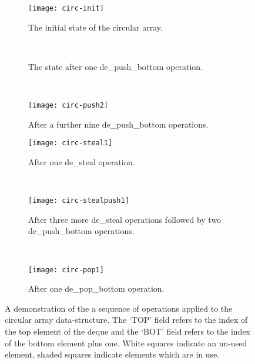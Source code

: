 \begin{figure}[t]
\centering

\begin{subfigure}[t]{0.31\textwidth}
\centering
  \texttt{[image: circ-init]}
  \caption{
     \tiny The initial state of the circular array.
  }
  \label{fig:circ-1}
\end{subfigure}
~ %
\begin{subfigure}[t]{0.31\textwidth}
  \centering
  \caption{
     \tiny The state after one de\_push\_bottom operation.
  }
  \label{fig:circ-2}
\end{subfigure}
~ %
\begin{subfigure}[t]{0.31\textwidth}
  \centering
  \texttt{[image: circ-push2]}
  \caption{
    \tiny After a further nine de\_push\_bottom operations. 
  }
  \label{fig:circ-3}
\end{subfigure}

\vspace{10pt}

\begin{subfigure}[t]{0.31\textwidth}
  \centering
  \texttt{[image: circ-steal1]}
  \caption{
    \tiny After one de\_steal operation.
  }
  \label{fig:circ-4}
\end{subfigure}
~ %
\begin{subfigure}[t]{0.31\textwidth}
  \centering
  \texttt{[image: circ-stealpush1]}
  \caption{
    \tiny After three more de\_steal operations followed by two de\_push\_bottom
          operations.
  }
  \label{fig:circ-5}
\end{subfigure}
~ %
\begin{subfigure}[t]{0.31\textwidth}
  \centering
  \texttt{[image: circ-pop1]}
  \caption{
    \tiny After one de\_pop\_bottom operation.
  }
  \label{fig:circ-6}
\end{subfigure}

\caption{
    A demonstration of the a sequence of operations applied to the circular array
    data-structure.
    The `TOP' field refers to the index of the top element of the deque and
    the `BOT' field refers to the index of the bottom element plus one.
    White squares indicate an un-used element, shaded squares indicate
    elements which are in use.
}
\label{fig:circ-demo}
\end{figure}

